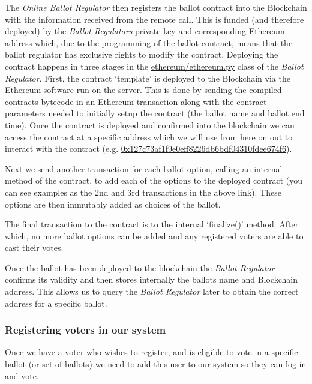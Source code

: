 \documentclass{article}
\begin{document}
The \textit{Online Ballot Regulator} then registers the ballot contract into the Blockchain with the information received from the remote call. This is funded (and therefore deployed) by the \textit{Ballot Regulators} private key and corresponding Ethereum address which, due to the programming of the ballot contract, means that the ballot regulator has exclusive rights to modify the contract. Deploying the contract happens in three stages in the \href{https://github.com/Mattie432/Blockchain-Voting-System/blob/master/Programming/4_OnlineBallotRegulator/ethereum/ethereum.py}{ethereum/ethereum.py} class of the \textit{Ballot Regulator}. First, the contract `template' is deployed to the Blockchain via the Ethereum software run on the server. This is done by sending the compiled contracts bytecode in an Ethereum transaction along with the contract parameters needed to initially setup the contract (the ballot name and ballot end time). Once the contract is deployed and confirmed into the blockchain we can access the contract at a specific address which we will use from here on out to interact with the contract (e.g. \href{https://etherscan.io/address/0x127c73af1f9e0eff8226db6bdf04310fdee674f6}{0x127c73af1f9e0eff8226db6bdf04310fdee674f6}).

Next we send another transaction for each ballot option, calling an internal method of the contract, to add each of the options to the deployed contract (you can see examples as the 2nd and 3rd transactions in the above link). These options are then immutably added as choices of the ballot.

The final transaction to the contract is to the internal `finalize()' method. After which, no more ballot options can be added and any registered voters are able to cast their votes.

Once the ballot has been deployed to the blockchain the \textit{Ballot Regulator} confirms its validity and then stores internally the ballots name and Blockchain address. This allows us to query the \textit{Ballot Regulator} later to obtain the correct address for a specific ballot.


\clearpage
\subsubsection{Registering voters in our system}
Once we have a voter who wishes to register, and is eligible to vote in a specific ballot (or set of ballots) we need to add this user to our system so they can log in and vote.
\end{document}

